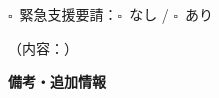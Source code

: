 \documentclass[a4paper,12pt]{jarticle}
\newcommand{\checkbox}{$\square$\ }
\newcommand{\underlinespace}[1]{\underline{\hspace{#1}}}
\begin{document}
\vspace{3mm}

\noindent
\checkbox 緊急支援要請：\quad \checkbox なし \quad / \quad \checkbox あり

\vspace{3mm}

\noindent
（内容：\underlinespace{10cm}）

\vspace{2mm}

\noindent
\underlinespace{13cm}

\vspace{8mm}

\begin{center}
\textbf{\large 備考・追加情報}
\end{center}

\vspace{3mm}

\noindent
\underlinespace{13cm}

\vspace{3mm}

\noindent
\underlinespace{13cm}

\vspace{3mm}

\noindent
\underlinespace{13cm}

\vspace{3mm}

\noindent
\underlinespace{13cm}

\vspace{3mm}

\noindent
\underlinespace{13cm}
\end{document}
